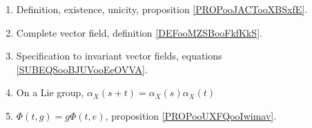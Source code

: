 
\begin{enumerate}
    \item
        Definition, existence, unicity, proposition \ref{PROPooJACTooXBSxfE}.
    \item
        Complete vector field, definition \ref{DEFooMZSBooFkfKkS}.
    \item
        Specification to invariant vector fields, equations \eqref{SUBEQSooBJUVooEeOVVA}.
    \item
        On a Lie group, \( \alpha_X(s+t)=\alpha_X(s)\alpha_X(t)\)
    \item
        \( \Phi(t,g)=g\Phi(t,e)\), proposition \ref{PROPooUXFQooIwimav}.
\end{enumerate}
